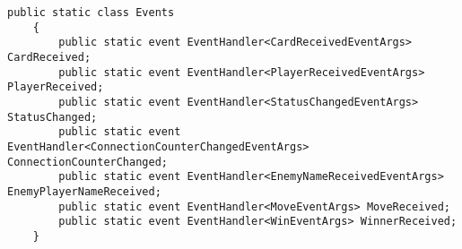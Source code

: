 \begin{lstlisting}[label=code:client-events, caption={Codeauschnitt Client Events}]
	public static class Events
	{
		public static event EventHandler<CardReceivedEventArgs> CardReceived;
		public static event EventHandler<PlayerReceivedEventArgs> PlayerReceived;
		public static event EventHandler<StatusChangedEventArgs> StatusChanged;
		public static event EventHandler<ConnectionCounterChangedEventArgs> ConnectionCounterChanged;
		public static event EventHandler<EnemyNameReceivedEventArgs> EnemyPlayerNameReceived;
		public static event EventHandler<MoveEventArgs> MoveReceived;
		public static event EventHandler<WinEventArgs> WinnerReceived;
	}	
\end{lstlisting}